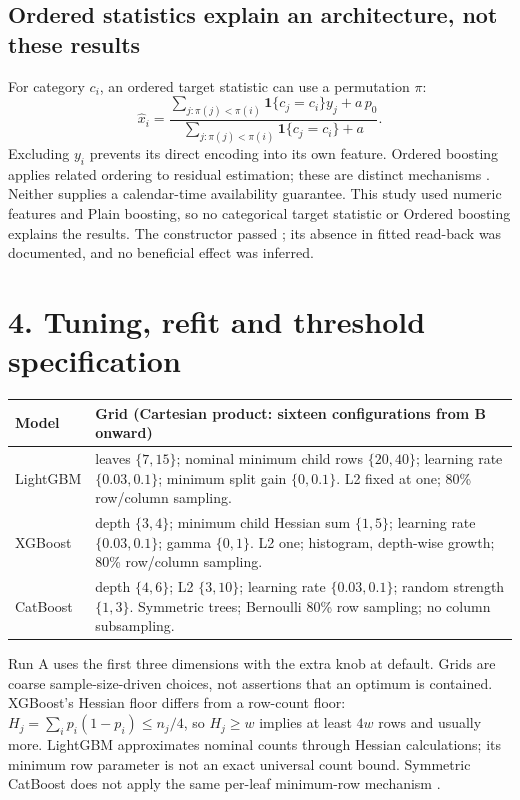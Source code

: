 \documentclass[11pt,a4paper]{article}
\begin{document}
\subsection*{Ordered statistics explain an architecture, not these results}
For category $c_i$, an ordered target statistic can use a permutation $\pi$:
\[
\widehat x_i=\frac{\sum_{j:\pi(j)<\pi(i)}\mathbf1\{c_j=c_i\}y_j+a\,p_0}
{\sum_{j:\pi(j)<\pi(i)}\mathbf1\{c_j=c_i\}+a}.
\]
Excluding $y_i$ prevents its direct encoding into its own feature. Ordered boosting applies related ordering to residual estimation; these are distinct mechanisms \cite{prokhorenkova2018catboost}. Neither supplies a calendar-time availability guarantee. This study used numeric features and Plain boosting, so no categorical target statistic or Ordered boosting explains the results. The constructor passed ; its absence in fitted read-back was documented, and no beneficial effect was inferred.

\section*{4. Tuning, refit and threshold specification}
\begingroup\small
\begin{longtable}{@{}p{.17\linewidth}p{.76\linewidth}@{}}\toprule
Model & Grid (Cartesian product: sixteen configurations from B onward)\\\midrule\endhead
LightGBM & leaves $\{7,15\}$; nominal minimum child rows $\{20,40\}$; learning rate $\{0.03,0.1\}$; minimum split gain $\{0,0.1\}$. L2 fixed at one; 80\% row/column sampling.\\
XGBoost & depth $\{3,4\}$; minimum child Hessian sum $\{1,5\}$; learning rate $\{0.03,0.1\}$; gamma $\{0,1\}$. L2 one; histogram, depth-wise growth; 80\% row/column sampling.\\
CatBoost & depth $\{4,6\}$; L2 $\{3,10\}$; learning rate $\{0.03,0.1\}$; random strength $\{1,3\}$. Symmetric trees; Bernoulli 80\% row sampling; no column subsampling.\\\bottomrule
\end{longtable}\endgroup
Run A uses the first three dimensions with the extra knob at default. Grids are coarse sample-size-driven choices, not assertions that an optimum is contained. XGBoost's Hessian floor differs from a row-count floor: $H_j=\sum_i p_i(1-p_i)\le n_j/4$, so $H_j\ge w$ implies at least $4w$ rows and usually more. LightGBM approximates nominal counts through Hessian calculations; its minimum row parameter is not an exact universal count bound. Symmetric CatBoost does not apply the same per-leaf minimum-row mechanism \cite{lightgbm470_params,xgboost_params,catboost_params}.
\end{document}
